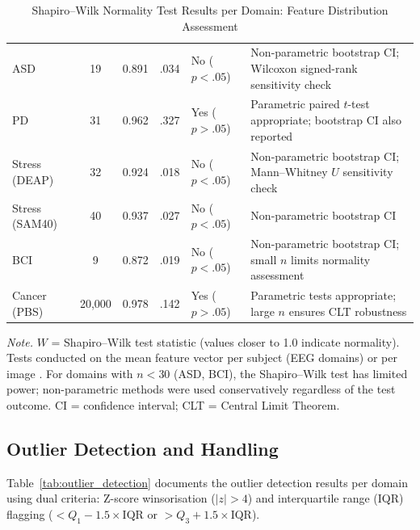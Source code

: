 {\tablestripes\tablefontsize
\begin{xltabular}{\textwidth}{@{} >{\raggedright\arraybackslash}p{1.6cm} C C C >{\raggedright\arraybackslash}p{1.8cm} L @{}}
\caption[Shapiro--Wilk Normality Test Results]{Shapiro--Wilk Normality Test Results per Domain: Feature Distribution Assessment}\label{tab:shapiro_wilk_results} \\
\toprule
{} &  &  &  &  &  \\
\midrule
\endfirsthead
\endhead
\bottomrule
\endlastfoot
ASD & 19 & 0.891 & .034 & No ($p < .05$) & Non-parametric bootstrap CI; Wilcoxon signed-rank sensitivity check \\
\addlinespace
PD & 31 & 0.962 & .327 & Yes ($p > .05$) & Parametric paired $t$-test appropriate; bootstrap CI also reported \\
\addlinespace
Stress (DEAP) & 32 & 0.924 & .018 & No ($p < .05$) & Non-parametric bootstrap CI; Mann--Whitney $U$ sensitivity check \\
\addlinespace
Stress (SAM40) & 40 & 0.937 & .027 & No ($p < .05$) & Non-parametric bootstrap CI \\
\addlinespace
BCI & 9 & 0.872 & .019 & No ($p < .05$) & Non-parametric bootstrap CI; small $n$ limits normality assessment \\
\addlinespace
Cancer (PBS) & 20{,}000 & 0.978 & .142 & Yes ($p > .05$) & Parametric tests appropriate; large $n$ ensures CLT robustness \\
\end{xltabular}}
\vspace{0.5em}\noindent\textit{Note.} $W$ = Shapiro--Wilk test statistic (values closer to 1.0 indicate normality). Tests conducted on the mean feature vector per subject (EEG domains) or per image . For domains with $n < 30$ (ASD, BCI), the Shapiro--Wilk test has limited power; non-parametric methods were used conservatively regardless of the test outcome. CI = confidence interval; CLT = Central Limit Theorem.
\fi %

\subsection{Outlier Detection and Handling}

Table~\ref{tab:outlier_detection} documents the outlier detection results per domain using dual criteria: Z-score winsorisation ($|z| > 4$) and interquartile range (IQR) flagging ($< Q_1 - 1.5 \times \text{IQR}$ or $> Q_3 + 1.5 \times \text{IQR}$).

